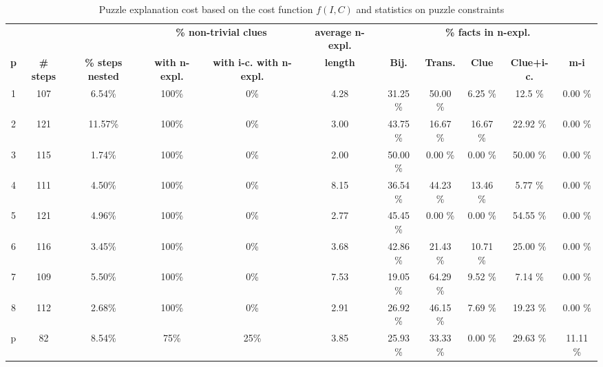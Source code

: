 \begin{landscape}
	\begin{table}
		\centering
	\begin{tabular}{c|cc|cc|c|ccccc}
		  &  		  &           & \multicolumn{2}{c|}{\textbf{\% non-trivial clues}} & \multicolumn{1}{c|}{\textbf{average n-expl.}}& \multicolumn{5}{c}{\textbf{\% facts in n-expl.}} \\
	\textbf{p} &  \textbf{\# steps} & \textbf{\% steps nested} & \textbf{with n-expl.} & \textbf{with i-c. with n-expl.}  			&   \textbf{length}  &  \textbf{Bij.} &   \textbf{Trans.} &  \textbf{Clue}  &  \textbf{Clue+i-c.} &  \textbf{m-i} \\
		\hline
		1 &      107 &     6.54\% &       100\% &        0\% &    4.28 &       31.25 \% &          50.00 \% &                6.25 \% &              12.5 \% &          0.00 \% \\
		2 &      121 &    11.57\% &       100\% &        0\% &    3.00 &       43.75 \% &         16.67 \% &               16.67 \% &             22.92 \% &         0.00 \% \\
		3 &      115 &     1.74\% &       100\% &        0\% &    2.00 &        50.00 \% &             0.00 \% &                  0.00 \% &              50.00 \% &           0.00 \% \\
		4 &      111 &      4.50\% &       100\% &        0\% &    8.15 &       36.54 \% &         44.23 \% &               13.46 \% &              5.77 \% &         0.00 \% \\
		5 &      121 &     4.96\% &       100\% &        0\% &    2.77 &       45.45 \% &             0.00 \% &                  0.00 \% &             54.55 \% &          0.00 \% \\
		6 &      116 &     3.45\% &       100\% &        0\% &    3.68 &       42.86 \% &         21.43 \% &               10.71 \% &              25.00 \% &         0.00 \% \\
		7 &      109 &      5.50\% &       100\% &        0\% &    7.53 &       19.05 \% &         64.29 \% &                9.52 \% &              7.14 \% &          0.00 \% \\
		8 &      112 &     2.68\% &      100\% &        0\% &    2.91 &       26.92 \% &         46.15 \% &                7.69 \% &             19.23 \% &           0.00 \% \\
		p &       82 &     8.54\% &      75\% &     	25\% &       3.85 &       25.93 \% &         33.33 \% &                   0.00 \% &             29.63 \% &       11.11 \% 
		\end{tabular}
		\caption{Puzzle explanation cost based on the cost function $f(I, C)$ and statistics on puzzle constraints}
		\label{table:sequence_leve}
		\end{table}
	\end{landscape}


	